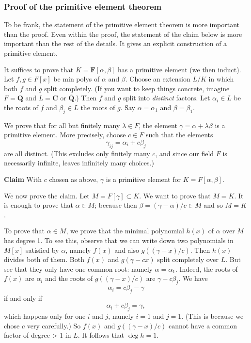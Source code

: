 \documentclass[11pt]{article}
\begin{document}
\subsubsection{Proof of the primitive element theorem}
\label{sec:org94e8669}

To be frank, the statement of the primitive element theorem is more important than the proof.
Even within the proof, the statement of the claim below is more important than the rest of the details.
It gives an explicit construction of a primitive element.

It suffices to prove that \(K = \mathbf{F}[\alpha, \beta]\) has a primitive element (we then induct).
Let \(f,g \in F[x]\) be min polys of \(\alpha\) and \(\beta\).
Choose an extension \(L / K\) in which both \(f\) and \(g\) split completely.
(If you want to keep things concrete, imagine \(F = \mathbf{Q}\) and \(L = \mathbf{C}\) or \(\overline{\mathbf{Q}}\).)
Then \(f\) and \(g\) split into \emph{distinct} factors.
Let \(\alpha_i \in L\) be the roots of \(f\) and \(\beta_j \in L\) the roots of \(g\).
Say \(\alpha = \alpha_1\) and \(\beta = \beta_1\).

We prove that for all but finitely many \(\lambda \in F\), the element \(\gamma = \alpha + \lambda \beta\) is a primitive element.
More precisely, choose \(c \in F\) such that the elements
\[ \gamma_{ij} = \alpha_i + c \beta_j\]
are all distinct.
(This excludes only  finitely many \(c\), and since our field \(F\) is necessarily infinite, leaves infinitely many choices.)

\textbf{\textbf{Claim}} With \(c\) chosen as above, \(\gamma\) is a primitive element for \(K = F[\alpha,\beta]\).

We now prove the claim.
Let \(M = F[\gamma] \subset K\).
We want to prove that \(M = K\).
It is enough to prove that \(\alpha \in M\); because then \(\beta = (\gamma - \alpha)/c \in M\) and so \(M = K\).

To prove that \(\alpha \in M\), we prove that the minimal polynomial \(h(x)\) of \(\alpha\) over \(M\) has degree 1.
To see this, observe that we can write down two polynomials in \(M[x]\) satisfied by \(\alpha\), namely \(f(x)\) and also \(g((\gamma - x)/c)\).
Then \(h(x)\) divides both of them.
Both \(f(x)\) and \(g(\gamma - cx)\) split completely over \(L\).
But see that they only have one common root: namely \(\alpha = \alpha_1\).
Indeed, the roots of \(f(x)\) are \(\alpha_i\) and the roots of \(g((\gamma - x)/c)\) are \(\gamma - c \beta_{j}\).
We have
\[ \alpha_i = c\beta_j - \gamma\]
if and only if
\[  \alpha_i + c\beta_j = \gamma,\]
which happens only for one \(i\) and \(j\), namely \(i = 1\) and \(j = 1\).
(This is because we chose \(c\) very carefully.)
So \(f(x)\) and \(g((\gamma - x)/c)\) cannot have a common factor of degree > 1 in \(L\).
It follows that \(\deg h = 1\).
\end{document}
